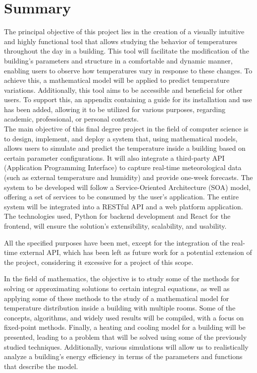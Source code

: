 %

\chapter{Summary}
The principal objective of this project lies in the creation of a visually intuitive and highly functional tool that allows studying the behavior of temperatures throughout the day in a building. This tool will facilitate the modification of the building’s parameters and structure in a comfortable and dynamic manner, enabling users to observe how temperatures vary in response to these changes. To achieve this, a mathematical model will be applied to predict temperature variations. Additionally, this tool aims to be accessible and beneficial for other users. To support this, an appendix containing a guide for its installation and use has been added, allowing it to be utilized for various purposes, regarding academic, professional, or personal contexts.\\

The main objective of this final degree project in the field of computer science is to design, implement, and deploy a system that, using mathematical models, allows users to simulate and predict the temperature inside a building based on certain parameter configurations. It will also integrate a third-party API (Application Programming Interface) to capture real-time meteorological data (such as external temperature and humidity) and provide one-week forecasts. The system to be developed will follow a Service-Oriented Architecture (SOA) model, offering a set of services to be consumed by the user's application. The entire system will be integrated into a RESTful API and a web platform application. The technologies used, Python for backend development and React for the frontend, will ensure the solution's extensibility, scalability, and usability.

All the specified purposes have been met, except for the integration of the real-time external API, which has been left as future work for a potential extension of the project, considering it excessive for a project of this scope.

In the field of mathematics, the objective is to study some of the methods for solving or approximating solutions to certain integral equations, as well as applying some of these methods to the study of a mathematical model for temperature distribution inside a building with multiple rooms. Some of the concepts, algorithms, and widely used results will be compiled, with a focus on fixed-point methods. Finally, a heating and cooling model for a building will be presented, leading to a problem that will be solved using some of the previously studied techniques. Additionally, various simulations will allow us to realistically analyze a building's energy efficiency in terms of the parameters and functions that describe the model.

